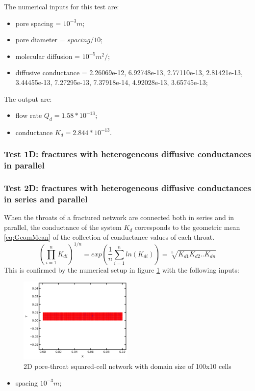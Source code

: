 \documentclass{article}
\begin{document}
The numerical inputs for this test are:
\begin{itemize}
    \item pore spacing = $10^{-3} m$;
    \item pore diameter = $spacing/10$;
    \item molecular diffusion = $10^{-5} m^2/$;
    \item diffusive conductance = 2.26069e-12, 6.92748e-13, 2.77110e-13, 2.81421e-13, 3.44455e-13,
       7.27295e-13, 7.37918e-14, 4.92028e-13, 3.65745e-13;
\end{itemize}
The output are:
\begin{itemize}
    \item flow rate $Q_d = 1.58*10^{-13}$;
    \item conductance $K_d = 2.844*10^{-13}$.
\end{itemize}

\FloatBarrier  %
\subsubsection{Test 1D: fractures with heterogeneous diffusive conductances in parallel}

\FloatBarrier  %
\subsubsection{Test 2D: fractures with heterogeneous diffusive conductances in series and parallel}
When the throats of a fractured network are connected both in series and in parallel, the conductance of the system $K_d$ corresponds to the geometric mean \ref{eq:GeomMean} of the collection of conductance values of each throat.
\begin{equation}
    \left( \prod_{i=1}^n K_{di} \right)^{1/n} = exp \left(\frac{1}{n} \sum_{i=1}^n ln(K_{di}) \right) = \sqrt[n]{K_{d1}K_{d2}..K_{dn}}
    \label{eq:GeomMean}
\end{equation}
This is confirmed by the numerical setup in figure \ref{fig:Network2D} with the following inputs:
\begin{figure}[h]
    \centering
    \includegraphics[width=0.5\textwidth]{images/fromOpenPNM/rectangular2Dpn100x10.png}
    \caption{2D pore-throat squared-cell network with domain size of 100x10 cells}
    \label{fig:Network2D}
\end{figure}
\begin{itemize}
    \item spacing $10^{-3} m$;
\end{itemize}
\end{document}
